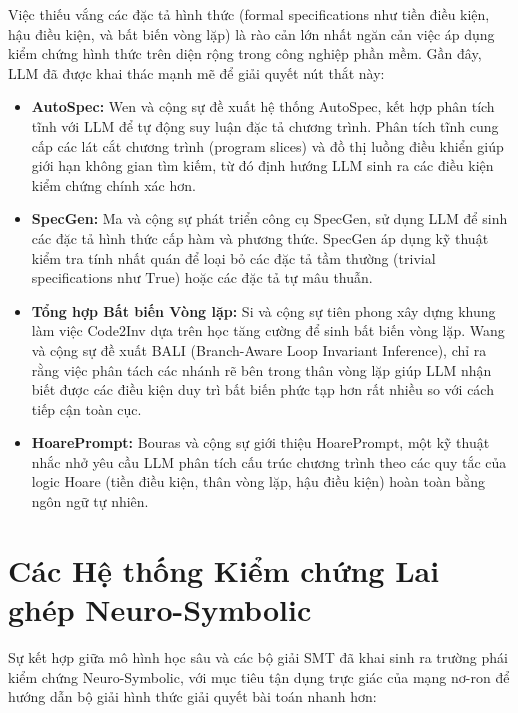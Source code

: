 Việc thiếu vắng các đặc tả hình thức (formal specifications như tiền điều kiện, hậu điều kiện, và bất biến vòng lặp) là rào cản lớn nhất ngăn cản việc áp dụng kiểm chứng hình thức trên diện rộng trong công nghiệp phần mềm. Gần đây, LLM đã được khai thác mạnh mẽ để giải quyết nút thắt này:

\begin{itemize}
    \item \textbf{AutoSpec:} Wen và cộng sự \cite{wen2024autospec} đề xuất hệ thống AutoSpec, kết hợp phân tích tĩnh với LLM để tự động suy luận đặc tả chương trình. Phân tích tĩnh cung cấp các lát cắt chương trình (program slices) và đồ thị luồng điều khiển giúp giới hạn không gian tìm kiếm, từ đó định hướng LLM sinh ra các điều kiện kiểm chứng chính xác hơn.
    \item \textbf{SpecGen:} Ma và cộng sự \cite{ma2025specgen} phát triển công cụ SpecGen, sử dụng LLM để sinh các đặc tả hình thức cấp hàm và phương thức. SpecGen áp dụng kỹ thuật kiểm tra tính nhất quán để loại bỏ các đặc tả tầm thường (trivial specifications như $\text{True}$) hoặc các đặc tả tự mâu thuẫn.
    \item \textbf{Tổng hợp Bất biến Vòng lặp:} Si và cộng sự \cite{si2020code2inv} tiên phong xây dựng khung làm việc Code2Inv dựa trên học tăng cường để sinh bất biến vòng lặp. Wang và cộng sự \cite{wang2026bali} đề xuất BALI (Branch-Aware Loop Invariant Inference), chỉ ra rằng việc phân tách các nhánh rẽ bên trong thân vòng lặp giúp LLM nhận biết được các điều kiện duy trì bất biến phức tạp hơn rất nhiều so với cách tiếp cận toàn cục.
    \item \textbf{HoarePrompt:} Bouras và cộng sự \cite{bouras2026hoareprompt} giới thiệu HoarePrompt, một kỹ thuật nhắc nhở yêu cầu LLM phân tích cấu trúc chương trình theo các quy tắc của logic Hoare (tiền điều kiện, thân vòng lặp, hậu điều kiện) hoàn toàn bằng ngôn ngữ tự nhiên.
\end{itemize}

\section{Các Hệ thống Kiểm chứng Lai ghép Neuro-Symbolic}
\label{sec:neuro_symbolic_verification_systems}

Sự kết hợp giữa mô hình học sâu và các bộ giải SMT đã khai sinh ra trường phái kiểm chứng Neuro-Symbolic, với mục tiêu tận dụng trực giác của mạng nơ-ron để hướng dẫn bộ giải hình thức giải quyết bài toán nhanh hơn:

